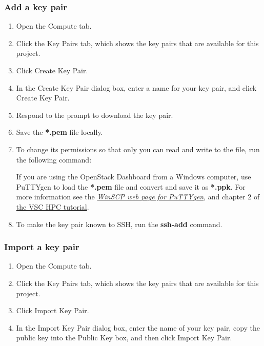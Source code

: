 \subsubsection{Add a key pair}\label{add-a-key-pair}
\begin{enumerate}
\item Open the Compute tab.
\item Click the Key Pairs tab, which shows the key pairs that are
  available for this project.
\item Click Create Key Pair.
\item In the Create Key Pair dialog box, enter a name for your key
  pair, and click Create Key Pair.
\item Respond to the prompt to download the key pair.
\item Save the \textbf{*.pem} file locally.
\item To change its permissions so that only you can read and write to
  the file, run the following command:

  \begin{prompt}
  \end{prompt}

   If you are using the \gls{OpenStack Dashboard} from a
  Windows computer, use PuTTYgen to load the \textbf{*.pem} file and
  convert and save it as \textbf{*.ppk}.  For more information see the
  \href{https://winscp.net/eng/docs/ui_puttygen}{\emph{WinSCP web page
      for PuTTYgen}}, and chapter 2 of
  \href{https://www.vscentrum.be/support/tut-book/vsc-tutorials}{the
    VSC HPC tutorial}.

\item To make the key pair known to SSH, run the \textbf{ssh-add}
  command.

  \begin{prompt}
  \end{prompt}
\end{enumerate}

\subsubsection{Import a key pair}\label{import-a-key-pair}
\begin{enumerate}
\item Open the Compute tab.
\item Click the Key Pairs tab, which shows the key pairs that are
  available for this project.
\item Click Import Key Pair.
\item In the Import Key Pair dialog box, enter the name of your key
  pair, copy the public key into the Public Key box, and then click
  Import Key Pair.
\end{enumerate}

